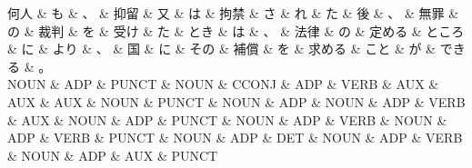 \documentclass[tikz,border=5pt]{standalone}
\begin{document}
\small
\begin{dependency}[edge unit distance=12.0pt]
    \begin{deptext}[column sep=0.5em]
        何人 \& も \& 、 \& 抑留 \& 又 \& は \& 拘禁 \& さ \& れ \& た \& 後 \& 、 \& 無罪 \& の \& 裁判 \& を \& 受け \& た \& とき \& は \& 、 \& 法律 \& の \& 定める \& ところ \& に \& より \& 、 \& 国 \& に \& その \& 補償 \& を \& 求める \& こと \& が \& できる \& 。\\
        NOUN \& ADP \& PUNCT \& NOUN \& CCONJ \& ADP \& VERB \& AUX \& AUX \& AUX \& NOUN \& PUNCT \& NOUN \& ADP \& NOUN \& ADP \& VERB \& AUX \& NOUN \& ADP \& PUNCT \& NOUN \& ADP \& VERB \& NOUN \& ADP \& VERB \& PUNCT \& NOUN \& ADP \& DET \& NOUN \& ADP \& VERB \& NOUN \& ADP \& AUX \& PUNCT\\
    \end{deptext}
\end{dependency}
\end{document}
